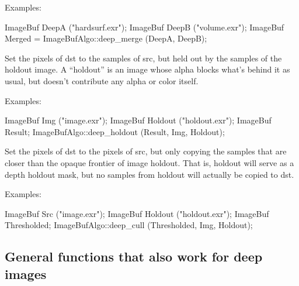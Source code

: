 \smallskip
\noindent Examples:
\begin{code}
    ImageBuf DeepA ("hardsurf.exr");
    ImageBuf DeepB ("volume.exr");
    ImageBuf Merged = ImageBufAlgo::deep_merge (DeepA, DeepB);
\end{code}
\apiend

  
Set the pixels of {\cf dst} to the samples of {\cf src}, but held out by the
samples of the {\cf holdout} image. A ``holdout'' is an image whose alpha
blocks what's behind it as usual, but doesn't contribute any alpha or color
itself.

\smallskip
\noindent Examples:
\begin{code}
    ImageBuf Img ("image.exr");
    ImageBuf Holdout ("holdout.exr");
    ImageBuf Result;
    ImageBufAlgo::deep_holdout (Result, Img, Holdout);
\end{code}
\apiend


  
\NEW %
Set the pixels of {\cf dst} to the pixels of {\cf src}, but only copying the
samples that are closer than the opaque frontier of image {\cf holdout}.
That is, {\cf holdout} will serve as a depth holdout mask, but no samples
from {\cf holdout} will actually be copied to {\cf dst}.

\smallskip
\noindent Examples:
\begin{code}
    ImageBuf Src ("image.exr");
    ImageBuf Holdout ("holdout.exr");
    ImageBuf Thresholded;
    ImageBufAlgo::deep_cull (Thresholded, Img, Holdout);
\end{code}
\apiend


\subsection{General functions that also work for deep images}

